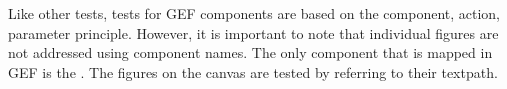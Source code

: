 Like other \gd{} tests, tests for GEF components are based on the component, action, parameter principle. However, it is important to note that individual figures are not addressed using component names. The only component that is mapped in GEF is the .  The figures on the canvas are tested by referring to their textpath. 
